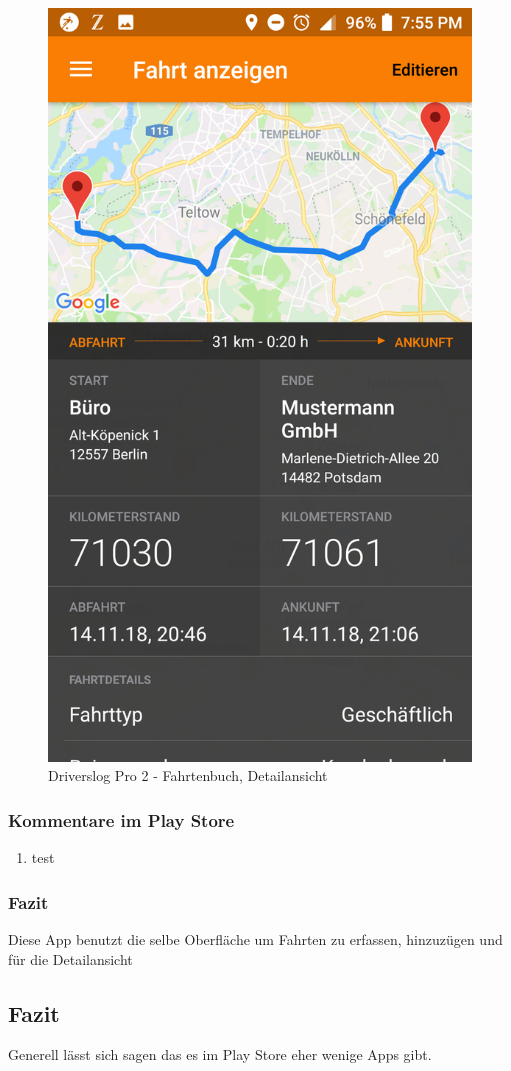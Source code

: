 \begin{figure}[!htp]
        \includegraphics[scale=0.12]{img/pro5}
        \caption{\label{img:img/pro5}Driverslog Pro 2 - Fahrtenbuch, Detailansicht}
\end{figure}


\subsubsection{Kommentare im Play Store}
\begin{enumerate}
    \item test
\end{enumerate}

\subsubsection{Fazit}
Diese App benutzt die selbe Oberfläche um Fahrten zu erfassen, hinzuzügen und für die Detailansicht

\subsection{Fazit}
Generell lässt sich sagen das es im Play Store eher wenige Apps gibt.
